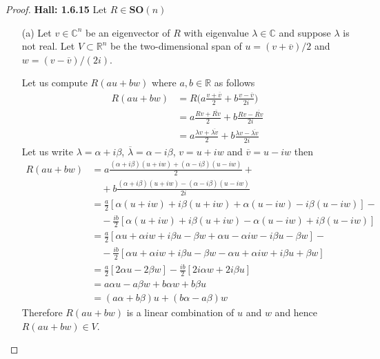 \documentclass[11pt]{article}
\newcommand{\R}{\mathbb{R}}
\newcommand{\C}{\mathbb{C}}
\theoremstyle{definition}
\begin{document}
\begin{proof}{\textbf{Hall: 1.6.15}}
Let $R \in \bm{SO}(n)$
\begin{itemize}
    \item [(a)] Let $v \in \C^n$ be an eigenvector of $R$ with eigenvalue
    $\lambda \in \C$ and suppose $\lambda$ is not real.
    Let $V \subset \R^n$ be the two-dimensional span of
    $u = (v + \overline{v})/2$ and $w = (v - \overline{v})/(2i)$.

    Let us compute $R(au + bw)$ where $a,b \in \R$ as follows
    \begin{align*}
        R(au + bw) &= R\bigg(a\frac{v + \overline{v}}{2} + b\frac{v - \overline{v}}{2i}\bigg)\\
        &= a\frac{Rv + \overline{Rv}}{2} + b\frac{Rv - \overline{Rv}}{2i}\\
        &= a\frac{\lambda v + \overline{\lambda v}}{2}
        + b\frac{\lambda v - \overline{\lambda v}}{2i}
    \end{align*}
    Let us write $\lambda = \alpha + i\beta$, $\overline{\lambda} = \alpha - i\beta$,
    $v = u + iw$ and $\overline{v} = u - iw$ then
    \begin{align*}
        R(au + bw)
        &= a\frac{(\alpha + i\beta)(u + iw) + (\alpha - i\beta)(u - iw)}{2} + \\
        &\quad+ b\frac{(\alpha + i\beta)(u + iw) - (\alpha - i\beta)(u - iw)}{2i}\\
        &= \frac{a}{2}
        [\alpha(u + iw) + i\beta(u + iw) + \alpha(u - iw) - i\beta(u - iw)] - \\
        &\quad- \frac{ib}{2}[
            \alpha(u + iw) + i\beta(u + iw) - \alpha(u - iw) + i\beta(u - iw)
        ]\\
        &= \frac{a}{2}
        [\alpha u + \alpha iw + i\beta u - \beta w
        + \alpha u - \alpha iw - i\beta u - \beta w] - \\
        &\quad- \frac{ib}{2}
        [\alpha u + \alpha iw + i\beta u - \beta w 
        - \alpha u + \alpha iw + i\beta u + \beta w]\\
        &= \frac{a}{2}[2\alpha u - 2\beta w]
        - \frac{ib}{2}[2i\alpha w + 2i\beta u]\\
        &= a\alpha u - a\beta w + b\alpha w + b \beta u\\
        &= (a\alpha + b\beta)u + (b\alpha-a\beta)w
    \end{align*}
    Therefore $R(au + bw)$ is a linear combination of $u$ and $w$ and hence
    $R(au + bw) \in V$.


\end{itemize}
\end{proof}
\end{document}

